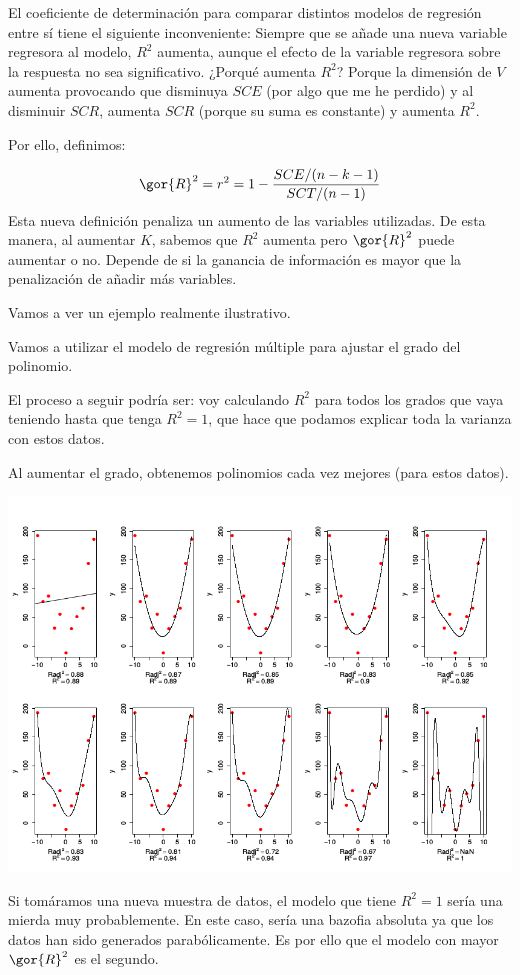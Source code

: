 El coeficiente de determinación para comparar distintos modelos de regresión entre sí tiene el siguiente inconveniente:
Siempre que se añade una nueva variable regresora al modelo, $R^2$ aumenta, aunque el efecto de la variable regresora sobre la respuesta no sea significativo. ¿Porqué aumenta $R^2$? Porque la dimensión de $V$ aumenta provocando que disminuya $SCE$ (por algo que me he perdido) y al disminuir $SCR$, aumenta $SCR$ (porque su suma es constante) y aumenta $R^2$.



Por ello, definimos:


\begin{defn}
\[\gor{R}^2 = r^2 = 1 - \frac{SCE/(n-k-1)}{SCT/(n-1)}\]
Esta nueva definición penaliza un aumento de las variables utilizadas. De esta manera, al aumentar $K$, sabemos que $R^2$ aumenta pero $\gor{R}^2$ puede aumentar o no. Depende de si la ganancia de información es mayor que la penalización de añadir más variables.
\end{defn}

Vamos a ver un ejemplo realmente ilustrativo.
\begin{example}

Vamos a utilizar el modelo de regresión múltiple para ajustar el grado del polinomio.

El proceso a seguir podría ser: voy calculando $R^2$ para todos los grados que vaya teniendo hasta que tenga $R^2 = 1$, que hace que podamos explicar toda la varianza con estos datos.


Al aumentar el grado, obtenemos polinomios cada vez mejores (para estos datos).

\begin{center}
\includegraphics[scale=0.45]{img/RvsRAdj.png}
\end{center}

Si tomáramos una nueva muestra de datos, el modelo que tiene $R^2=1$ sería una mierda muy probablemente. En este caso, sería una bazofia absoluta ya que los datos han sido generados parabólicamente. Es por ello que el modelo con mayor $\gor{R}^2$ es el segundo.

\end{example}


